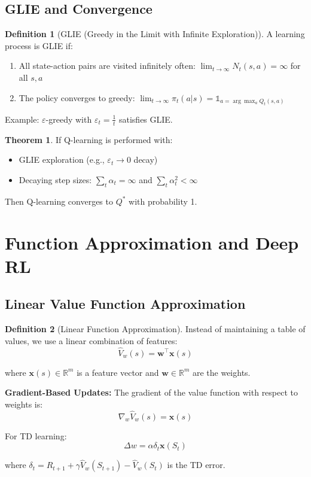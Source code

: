 \documentclass[12pt,a4paper]{article}
\theoremstyle{definition}
\newtheorem{definition}{Definition}[section]
\newtheorem{theorem}{Theorem}[section]
\begin{document}
\subsection{GLIE and Convergence}

\begin{definition}[GLIE (Greedy in the Limit with Infinite Exploration)]
A learning process is GLIE if:
\begin{enumerate}
    \item All state-action pairs are visited infinitely often: $\lim_{t \to \infty} N_t(s,a) = \infty$ for all $s, a$
    \item The policy converges to greedy: $\lim_{t \to \infty} \pi_t(a | s) = \mathbb{1}_{a = \arg\max_a Q_t(s,a)}$
\end{enumerate}

Example: $\varepsilon$-greedy with $\varepsilon_t = \frac{1}{t}$ satisfies GLIE.

\begin{theorem}
If Q-learning is performed with:
\begin{itemize}
    \item GLIE exploration (e.g., $\varepsilon_t \to 0$ decay)
    \item Decaying step sizes: $\sum_t \alpha_t = \infty$ and $\sum_t \alpha_t^2 < \infty$
\end{itemize}

Then Q-learning converges to $Q^*$ with probability 1.
\end{theorem}
\end{definition}

\section{Function Approximation and Deep RL}

\subsection{Linear Value Function Approximation}

\begin{definition}[Linear Function Approximation]
Instead of maintaining a table of values, we use a linear combination of features:
\[
\hat{V}_w(s) = \mathbf{w}^\top \mathbf{x}(s)
\]

where $\mathbf{x}(s) \in \mathbb{R}^m$ is a feature vector and $\mathbf{w} \in \mathbb{R}^m$ are the weights.

\textbf{Gradient-Based Updates:}
The gradient of the value function with respect to weights is:
\[
\nabla_w \hat{V}_w(s) = \mathbf{x}(s)
\]

For TD learning:
\[
\Delta w = \alpha \delta_t \mathbf{x}(S_t)
\]

where $\delta_t = R_{t+1} + \gamma \hat{V}_w(S_{t+1}) - \hat{V}_w(S_t)$ is the TD error.
\end{definition}
\end{document}
